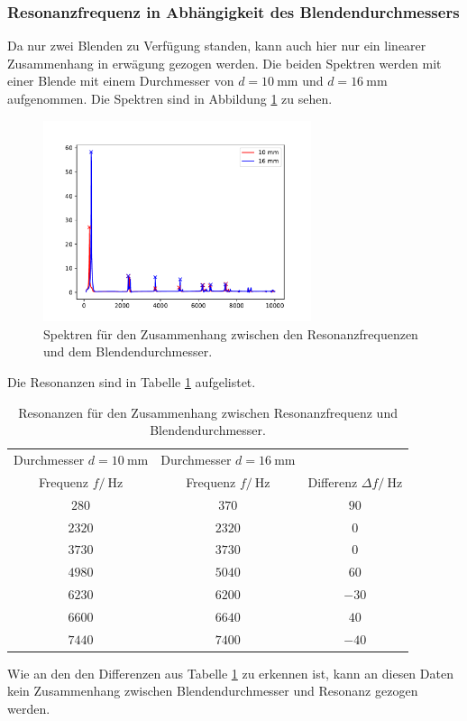 \subsubsection{Resonanzfrequenz in Abhängigkeit des Blendendurchmessers}
Da nur zwei Blenden zu Verfügung standen, kann auch hier nur ein linearer Zusammenhang in erwägung gezogen werden.
Die beiden Spektren werden mit einer Blende mit einem Durchmesser von $d=\SI{10}{\milli\meter}$ und
$d=\SI{16}{\milli\meter}$ aufgenommen. Die Spektren sind in Abbildung \ref{fig:Spektren_WM_Blende} zu sehen.
\FloatBarrier
\begin{figure}
    \centering
    \includegraphics[width = 0.7\textwidth , keepaspectratio]{figure/WM_Blenden.pdf}
    \caption{Spektren für den Zusammenhang zwischen den Resonanzfrequenzen und dem Blendendurchmesser.}
    \label{fig:Spektren_WM_Blende}
\end{figure}
\FloatBarrier
Die Resonanzen sind in Tabelle \ref{tab:Resonanz_WM_Blenden} aufgelistet.
\FloatBarrier
\begin{table}
    \centering
    \caption{Resonanzen für den Zusammenhang zwischen Resonanzfrequenz und Blendendurchmesser.}
    \label{tab:Resonanz_WM_Blenden}
    \begin{tabular}{c c c}
        \toprule
        Durchmesser $d=\SI{10}{\milli\meter}$ &Durchmesser $d=\SI{16}{\milli\meter}$& \\
        Frequenz $f /\SI{}{\hertz}$& Frequenz $f /\SI{}{\hertz}$&Differenz $\Delta f /\SI{}{\hertz}$\\
        \midrule
        $\num{280}$ &$\num{370}$ &$\num{90}$\\
        $\num{2320}$&$\num{2320}$&$\num{0}$\\
        $\num{3730}$&$\num{3730}$&$\num{0}$\\
        $\num{4980}$&$\num{5040}$&$\num{60}$\\
        $\num{6230}$&$\num{6200}$&$\num{-30}$\\
        $\num{6600}$&$\num{6640}$&$\num{40}$\\
        $\num{7440}$&$\num{7400}$&$\num{-40}$\\
        \bottomrule
    \end{tabular}
\end{table}
\FloatBarrier
Wie an den den Differenzen aus Tabelle \ref{tab:Resonanz_WM_Blenden} zu erkennen ist, kann an diesen Daten kein 
Zusammenhang zwischen Blendendurchmesser und Resonanz gezogen werden.

